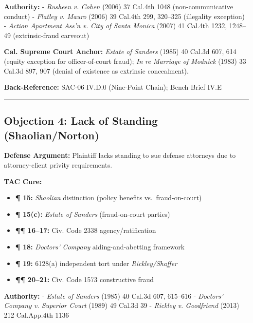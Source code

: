 \textbf{Authority:} - \emph{Rusheen v. Cohen} (2006) 37 Cal.4th 1048 (non-communicative conduct) - \emph{Flatley v. Mauro} (2006) 39 Cal.4th 299, 320--325 (illegality exception) - \emph{Action Apartment Ass'n v. City of Santa Monica} (2007) 41 Cal.4th 1232, 1248--49 (extrinsic-fraud carveout)

\textbf{Cal. Supreme Court Anchor:} \emph{Estate of Sanders} (1985) 40 Cal.3d 607, 614 (equity exception for officer-of-court fraud); \emph{In re Marriage of Modnick} (1983) 33 Cal.3d 897, 907 (denial of existence as extrinsic concealment).

\textbf{Back-Reference:} SAC-06 \textsection{}IV.D.0 (Nine-Point Chain); Bench Brief \textsection{}IV.E

\begin{center}\rule{0.5\linewidth}{0.5pt}\end{center}

\subsection{Objection 4: Lack of Standing (Shaolian/Norton)}\label{objection-4-lack-of-standing-shaoliannorton}

\textbf{Defense Argument:} Plaintiff lacks standing to sue defense attorneys due to attorney-client privity requirements.

\textbf{TAC Cure:}

\begin{itemize}
\tightlist
\item
  \textbf{¶ 15:} \emph{Shaolian} distinction (policy benefits vs.~fraud-on-court)
\item
  \textbf{¶ 15(c):} \emph{Estate of Sanders} (fraud-on-court parties)
\item
  \textbf{¶¶ 16--17:} Civ. Code \textsection{} 2338 agency/ratification
\item
  \textbf{¶ 18:} \emph{Doctors' Company} aiding-and-abetting framework
\item
  \textbf{¶ 19:} \textsection{} 6128(a) independent tort under \emph{Rickley/Shaffer}
\item
  \textbf{¶¶ 20--21:} Civ. Code \textsection{} 1573 constructive fraud
\end{itemize}

\textbf{Authority:} - \emph{Estate of Sanders} (1985) 40 Cal.3d 607, 615--616 - \emph{Doctors' Company v. Superior Court} (1989) 49 Cal.3d 39 - \emph{Rickley v. Goodfriend} (2013) 212 Cal.App.4th 1136

